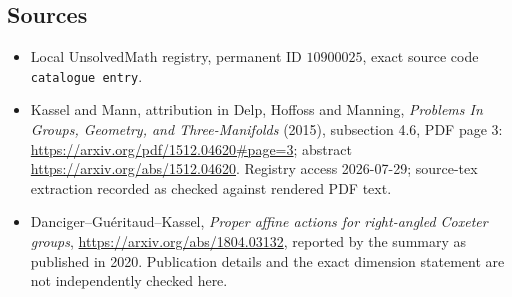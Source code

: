\documentclass[11pt]{article}
\begin{document}
\subsection{Sources}
\begin{itemize}
\item Local UnsolvedMath registry, permanent ID \(10900025\), exact source code \texttt{catalogue entry}.
\item Kassel and Mann, attribution in Delp, Hoffoss and Manning, \emph{Problems In Groups, Geometry, and Three-Manifolds} (2015), subsection 4.6, PDF page 3: \url{https://arxiv.org/pdf/1512.04620#page=3}; abstract \url{https://arxiv.org/abs/1512.04620}. Registry access 2026-07-29; source-tex extraction recorded as checked against rendered PDF text.
\item Danciger--Gu\'eritaud--Kassel, \emph{Proper affine actions for right-angled Coxeter groups}, \url{https://arxiv.org/abs/1804.03132}, reported by the summary as published in 2020. Publication details and the exact dimension statement are not independently checked here.
\end{itemize}
\end{document}
